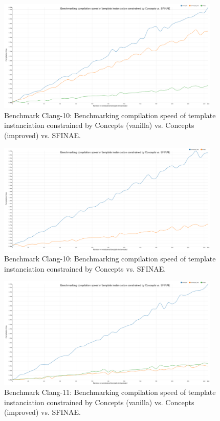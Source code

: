 \begin{figure}[htb]
  \centering
  \includegraphics[width=4.2in]{figs/compile_time_benches/clang10/chart.concept.png}
  \caption{Benchmark Clang-10: Benchmarking compilation speed of template instanciation constrained by Concepts (vanilla) vs. Concepts (improved) vs. SFINAE.}
  \label{fig.gen.bench.clang10.1.concept.sfinae}
\end{figure}

\begin{figure}[htb]
  \centering
  \includegraphics[width=4.2in]{figs/compile_time_benches/clang10/chart.concept2.png}
  \caption{Benchmark Clang-10: Benchmarking compilation speed of template instanciation constrained by Concepts vs. SFINAE.}
  \label{fig.gen.bench.clang10.2.concept.sfinae}
\end{figure}

\begin{figure}[htb]
  \centering
  \includegraphics[width=4.2in]{figs/compile_time_benches/clang11/chart.concept.png}
  \caption{Benchmark Clang-11: Benchmarking compilation speed of template instanciation constrained by Concepts (vanilla) vs. Concepts (improved) vs. SFINAE.}
  \label{fig.gen.bench.clang11.1.concept.sfinae}
\end{figure}

